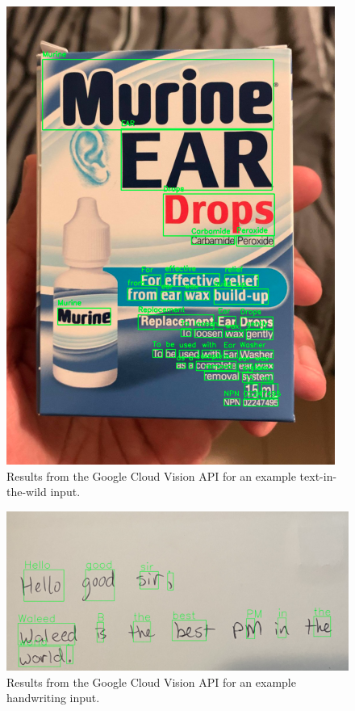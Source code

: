 \documentclass[a4paper,11pt]{article}
\begin{document}
\begin{figure}[H]
\centering
\includegraphics[scale=0.7]{img/cv_appendix/ocr_text_in_the_wild.png}
\caption{Results from the Google Cloud Vision API for an example text-in-the-wild input.}
\label{fig:ocr_text-in-the-wild}
\end{figure}

\begin{figure}[H]
\centering
\includegraphics[scale=0.9]{img/cv_appendix/ocr_handwriting.png}
\caption{Results from the Google Cloud Vision API for an example handwriting input.}
\label{fig:ocr_handwriting}
\end{figure}
\end{document}
